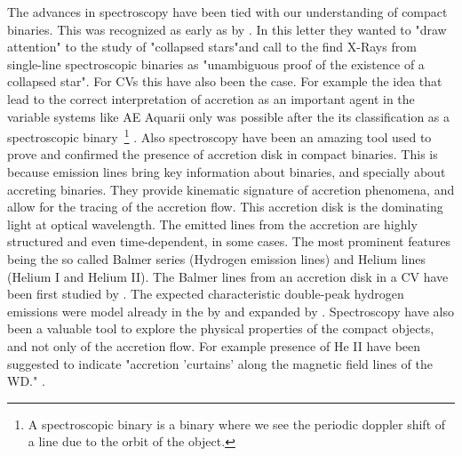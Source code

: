The advances in spectroscopy have been tied with our understanding of compact binaries. This was recognized as early as \citeyear{zeldovich_collapsed_1966} by \citeauthor{zeldovich_collapsed_1966}. In this letter they wanted to "draw attention" to the study of "collapsed stars"and call to the find X-Rays from single-line spectroscopic binaries as "unambiguous proof of the existence of a collapsed star". For CVs this have also been the case. For example the idea that lead to the correct interpretation of accretion as an important agent in the variable systems like AE Aquarii only was possible after the its classification as a spectroscopic binary~\footnote{A spectroscopic binary is a binary where we see the periodic doppler shift of a line due to the orbit of the object.} \citep{joy_spectroscopic_1954}. Also spectroscopy have been an amazing tool used to prove and confirmed the presence of accretion disk in compact binaries. This is because emission lines bring key information about binaries, and specially about accreting binaries. They provide kinematic signature of accretion phenomena, and allow for the tracing of the accretion flow. This accretion disk is the dominating light at optical wavelength. The emitted lines from the accretion are highly structured and even time-dependent, in some cases. The most prominent features being the so called Balmer series (Hydrogen emission lines) and Helium lines (Helium I and Helium II). The Balmer lines from an accretion disk in a CV have been first studied by \cite{williams_emission_1980}. The expected characteristic double-peak hydrogen emissions were model already in the \citeyear{smak_emission_1981} by \citeauthor{smak_emission_1981} and expanded by \cite{horne_emission_1986}. Spectroscopy have also been a valuable tool to explore the physical properties of the compact objects, and not only of the accretion flow. For example presence of He II have been suggested to indicate "accretion 'curtains' along the magnetic field lines of the WD." \citep{edmonds_cataclysmic_1999}.  


%


